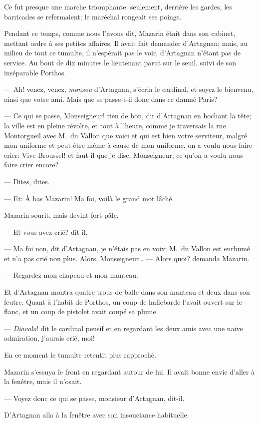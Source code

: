 Ce fut presque une marche triomphante: seulement, derrière les gardes, les barricades se refermaient; le maréchal rongeait ses poings.

Pendant ce temps, comme nous l'avons dit, Mazarin était dans son cabinet, mettant ordre à ses petites affaires. Il avait fait demander d'Artagnan; mais, au milieu de tout ce tumulte, il n'espérait pas le voir, d'Artagnan n'étant pas de service. Au bout de dix minutes le lieutenant parut sur le seuil, suivi de son inséparable Porthos.

— Ah! venez, venez, \textit{monsou} d'Artagnan, s'écria le cardinal, et soyez le bienvenu, ainsi que votre ami. Mais que se passe-t-il donc dans ce damné Paris?

— Ce qui se passe, Monseigneur! rien de bon, dit d'Artagnan en hochant la tête; la ville est en pleine révolte, et tout à l'heure, comme je traversais la rue Montorgueil avec M.~du Vallon que voici et qui est bien votre serviteur, malgré mon uniforme et peut-être même à cause de mon uniforme, on a voulu nous faire crier: Vive Broussel! et faut-il que je dise, Monseigneur, ce qu'on a voulu nous faire crier encore?

— Dites, dites.

— Et: À bas Mazarin! Ma foi, voilà le grand mot lâché.

Mazarin sourit, mais devint fort pâle.

— Et vous avez crié? dit-il.

— Ma foi non, dit d'Artagnan, je n'étais pas en voix; M.~du Vallon est enrhumé et n'a pas crié non plus. Alors, Monseigneur\dots
— Alors quoi? demanda Mazarin.

— Regardez mon chapeau et mon manteau.

Et d'Artagnan montra quatre trous de balle dans son manteau et deux dans son feutre. Quant à l'habit de Porthos, un coup de hallebarde l'avait ouvert sur le flanc, et un coup de pistolet avait coupé sa plume.

— \textit{Diavolo}! dit le cardinal pensif et en regardant les deux amis avec une naïve admiration, j'aurais crié, moi!

En ce moment le tumulte retentit plus rapproché.

Mazarin s'essuya le front en regardant autour de lui. Il avait bonne envie d'aller à la fenêtre, mais il n'osait.

— Voyez donc ce qui se passe, monsieur d'Artagnan, dit-il.

D'Artagnan alla à la fenêtre avec son insouciance habituelle.

